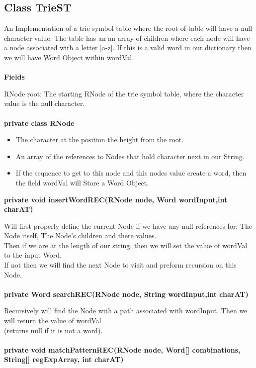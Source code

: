 \documentclass[11pt]{article}
\begin{document}
\subsection{Class TrieST}

An Implementation of a trie symbol table where the root of table will have a null character value. The table has an an array of children where each node will have a node associated with a letter  [a-z]. If this is a valid word in our dictionary then we will have Word Object within wordVal.\\\\
\textbf{Fields\\}

RNode root: The starting RNode of the trie symbol table, where the character value is the null character.\\\\
\textbf{private class RNode\\}
\begin{itemize}
	\item The character at the position the height from the root.
	\item An array of the references to Nodes that hold character next in our String.
	\item If the sequence to get to this node and this nodes value create a word, then the field wordVal will Store a Word Object.
\end{itemize}
\textbf{private void insertWordREC(RNode node, Word wordInput,int charAT)\\}

Will first properly define the current Node if we have any null references for: The Node itself, The Node's children and there values.\\Then if we are at the length of our string, then we will set the value of wordVal to the input Word. \\ If not then we will find the next Node to visit and preform recursion on this Node.\\\\
%
\textbf{private Word searchREC(RNode node, String wordInput,int charAT)\\}

Recursively will find the Node with a path associated with wordInput. Then we will return the value of wordVal \\(returns null if it is not a word).\\\\
%
\textbf{private void matchPatternREC(RNode node, Word[] combinations, String[] regExpArray, int charAT)\\}
\end{document}
